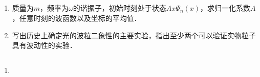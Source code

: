 
\subsection{ }
\begin{enumerate}
\item 质量为$m$，频率为$\omega$的谐振子，初始时刻处于状态$Ax\varPsi_{n}(x)$，求归一化系数$A$，任意时刻的波函数以及坐标的平均值．
\item 写出历史上确定光的波粒二象性的主要实验，指出至少两个可以验证实物粒子具有波动性的实验．
\end{enumerate}
\subsection{ }
\begin{enumerate}
\item 
\end{enumerate}